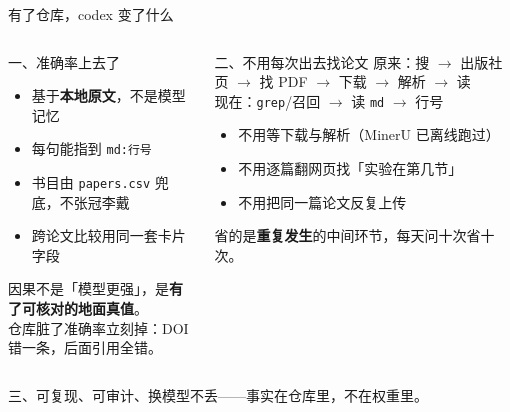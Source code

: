 \begin{frame}{有了仓库，codex 变了什么}
  \vspace{-2pt}
  \begin{columns}[T]
    \small
    \begin{block}{一、准确率上去了}
      \footnotesize
      \begin{itemize}
        \item 基于\textbf{本地原文}，不是模型记忆
        \item 每句能指到 \texttt{md:行号}
        \item 书目由 \texttt{papers.csv} 兜底，不张冠李戴
        \item 跨论文比较用同一套卡片字段
      \end{itemize}
      \vspace{0.3em}
      \scriptsize 因果不是「模型更强」，是\textbf{有了可核对的地面真值}。\\
      仓库脏了准确率立刻掉：DOI 错一条，后面引用全错。
    \end{block}

    \small
    \begin{block}{二、不用每次出去找论文}
      \footnotesize
      原来：搜 $\to$ 出版社页 $\to$ 找 PDF $\to$ 下载 $\to$ 解析 $\to$ 读\\
      现在：\texttt{grep}/召回 $\to$ 读 \texttt{md} $\to$ 行号
      \vspace{0.4em}
      \begin{itemize}
        \item 不用等下载与解析（MinerU 已离线跑过）
        \item 不用逐篇翻网页找「实验在第几节」
        \item 不用把同一篇论文反复上传
      \end{itemize}
      \vspace{0.3em}
      \scriptsize 省的是\textbf{重复发生}的中间环节，每天问十次省十次。
    \end{block}
  \end{columns}

  \vspace{0.3em}
  {\scriptsize 三、可复现、可审计、换模型不丢——事实在仓库里，不在权重里。}
\end{frame}


